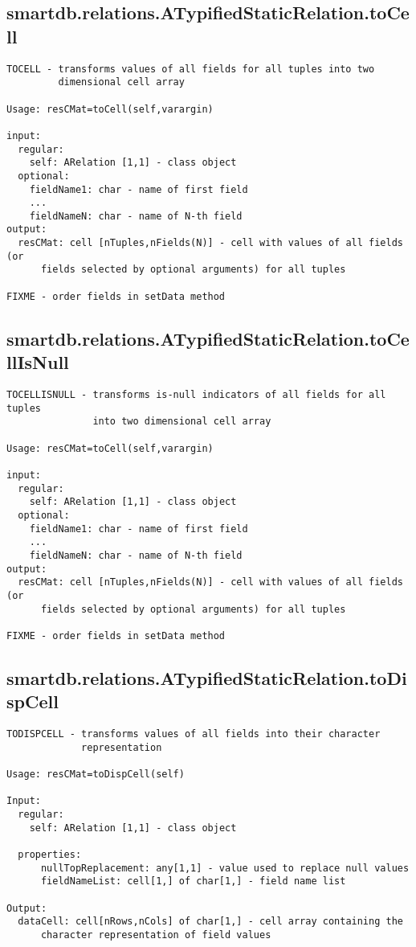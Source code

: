 \subsection{\texorpdfstring{smartdb.relations.ATypifiedStaticRelation.toCell}{toCell}}\label{method:smartdb.relations.ATypifiedStaticRelation.toCell}
\begin{verbatim}
TOCELL - transforms values of all fields for all tuples into two
         dimensional cell array

Usage: resCMat=toCell(self,varargin)

input:
  regular:
    self: ARelation [1,1] - class object
  optional:
    fieldName1: char - name of first field
    ...
    fieldNameN: char - name of N-th field
output:
  resCMat: cell [nTuples,nFields(N)] - cell with values of all fields (or
      fields selected by optional arguments) for all tuples

FIXME - order fields in setData method
\end{verbatim}
\subsection{\texorpdfstring{smartdb.relations.ATypifiedStaticRelation.toCellIsNull}{toCellIsNull}}\label{method:smartdb.relations.ATypifiedStaticRelation.toCellIsNull}
\begin{verbatim}
TOCELLISNULL - transforms is-null indicators of all fields for all tuples
               into two dimensional cell array

Usage: resCMat=toCell(self,varargin)

input:
  regular:
    self: ARelation [1,1] - class object
  optional:
    fieldName1: char - name of first field
    ...
    fieldNameN: char - name of N-th field
output:
  resCMat: cell [nTuples,nFields(N)] - cell with values of all fields (or
      fields selected by optional arguments) for all tuples

FIXME - order fields in setData method
\end{verbatim}
\subsection{\texorpdfstring{smartdb.relations.ATypifiedStaticRelation.toDispCell}{toDispCell}}\label{method:smartdb.relations.ATypifiedStaticRelation.toDispCell}
\begin{verbatim}
TODISPCELL - transforms values of all fields into their character
             representation

Usage: resCMat=toDispCell(self)

Input:
  regular:
    self: ARelation [1,1] - class object

  properties:
      nullTopReplacement: any[1,1] - value used to replace null values
      fieldNameList: cell[1,] of char[1,] - field name list

Output:
  dataCell: cell[nRows,nCols] of char[1,] - cell array containing the
      character representation of field values
\end{verbatim}
